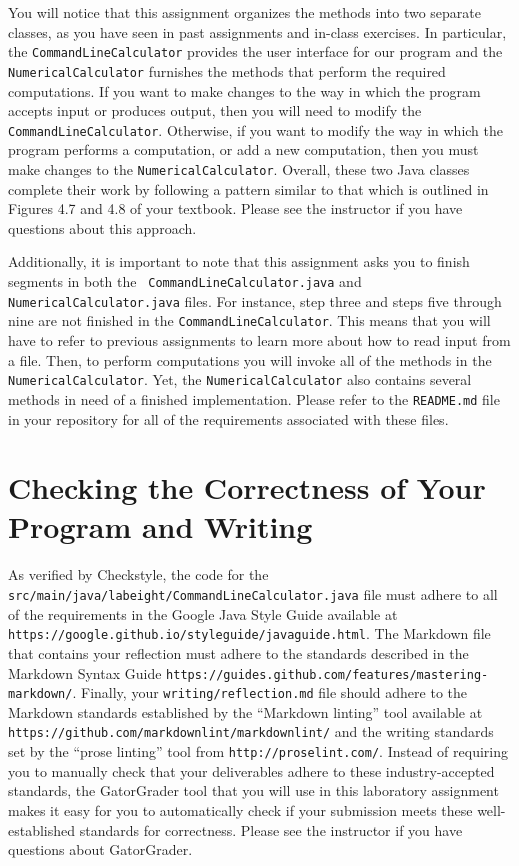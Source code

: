 \documentclass[11pt]{article}
\newcommand{\mainprogram}{\lstinline{CommandLineCalculator}}
\newcommand{\mainprogramsource}{\lstinline{src/main/java/labeight/CommandLineCalculator.java}}
\newcommand{\secondprogram}{\lstinline{NumericalCalculator}}
\newcommand{\reflection}{\lstinline{writing/reflection.md}}
\newcommand{\readme}{\lstinline{README.md}}
\newcommand{\url}[1]{\lstinline{#1}}
\newcommand{\step}[1]{``{#1}''}
\begin{document}
You will notice that this assignment organizes the methods into two separate classes, as you have seen in past
assignments and in-class exercises. In particular, the {\tt CommandLineCalculator} provides the user interface for our
program and the {\tt NumericalCalculator} furnishes the methods that perform the required computations. If you want to
make changes to the way in which the program accepts input or produces output, then you will need to modify the {\tt
CommandLineCalculator}. Otherwise, if you want to modify the way in which the program performs a computation, or add a
new computation, then you must make changes to the {\tt NumericalCalculator}. Overall, these two Java classes complete
their work by following a pattern similar to that which is outlined in Figures 4.7 and 4.8 of your textbook. Please see
the instructor if you have questions about this approach.

Additionally, it is important to note that this assignment asks you to finish segments in both the {\tt
CommandLineCalculator.java} and {\tt NumericalCalculator.java} files. For instance, step three and steps five through
nine are not finished in the \mainprogram{}. This means that you will have to refer to previous assignments to learn
more about how to read input from a file. Then, to perform computations you will invoke all of the methods in the
\secondprogram{}. Yet, the \secondprogram{} also contains several methods in need of a finished implementation. Please
refer to the \readme{} file in your repository for all of the requirements associated with these files.

\section*{Checking the Correctness of Your Program and Writing}

As verified by Checkstyle, the code for the \mainprogramsource{} file must adhere to all of the requirements in the
Google Java Style Guide available at \url{https://google.github.io/styleguide/javaguide.html}. The Markdown file that
contains your reflection must adhere to the standards described in the Markdown Syntax Guide
\url{https://guides.github.com/features/mastering-markdown/}. Finally, your \reflection{} file should adhere to the
Markdown standards established by the \step{Markdown linting} tool available at
\url{https://github.com/markdownlint/markdownlint/} and the writing standards set by the \step{prose linting} tool from
\url{http://proselint.com/}. Instead of requiring you to manually check that your deliverables adhere to these
industry-accepted standards, the GatorGrader tool that you will use in this laboratory assignment makes it easy for you
to automatically check if your submission meets these well-established standards for correctness. Please see the
instructor if you have questions about GatorGrader.
\end{document}
